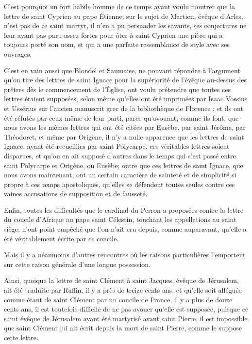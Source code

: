 C'est pourquoi un fort habile homme de ce temps ayant voulu montrer que la lettre de saint Cyprien au pape Étienne, sur le sujet de Martien, évêque d'Arles, n'est pas de ce saint martyr, il n'en a pu persuader les savants, ses conjectures ne leur ayant pas paru assez fortes pour ôter à saint Cyprien une pièce qui a toujours porté son nom, et qui a une parfaite ressemblance de style avec ses ouvrages.

C'est en vain aussi que Blondel et Saumaise, ne pouvant répondre à l'argument qu'on tire des lettres de saint Ignace pour la supériorité de l'évêque au-dessus des prêtres dès le commencement de l'Église, ont voulu prétendre que toutes ces lettres étaient supposées, selon même qu'elles ont été imprimées par Isaac Vossius et Ussérius sur l'ancien manuscrit grec de la bibliothèque de Florence ; et ils ont été réfutés par ceux même de leur parti, parce qu'avouant, comme ils font, que nous avons les mêmes lettres qui ont été citées par Eusèbe, par saint Jérôme, par Théodoret, et même par Origène, il n'y a nulle apparence que les lettres de saint Ignace, ayant été recueillies par saint Polycarpe, ces véritables lettres soient disparues, et qu'on en ait supposé d'autres dans le temps qui s'est passé entre saint Polycarpe et Origène, ou Eusèbe; outre que ces lettres de saint Ignace, que nous avons maintenant, ont un certain caractère de sainteté et de simplicité si propre à ces temps apostoliques, qu'elles se défendent toutes seules contre ces vaines accusations de supposition et de fausseté.

Enfin, toutes les difficultés que le cardinal du Perron a proposées contre la lettre du concile d'Afrique au pape saint Célestin, touchant les appellations au saint siège, n'ont point empêché que l'on n'ait cru depuis, comme auparavant, qu'elle a été véritablement écrite par ce concile.

Mais il y a néanmoins d'autres rencontres où les raisons particulières l'emportent sur cette raison générale d'une longue possession.

Ainsi, quoique la lettre de saint Clément à saint Jacques, évêque de Jérusalem, ait été traduite par Ruffin, il y a près de treize cents ans, et qu'elle soit alléguée comme étant de saint Clément par un concile de France, il y a plus de douze cents ans, il est toutefois difficile de ne pas avouer qu'elle est supposée, puisque ce saint évêque de Jérusalem ayant été martyrisé avant saint Pierre, il est impossible que saint Clément lui ait écrit depuis la mort de saint Pierre, comme le suppose cette lettre.

